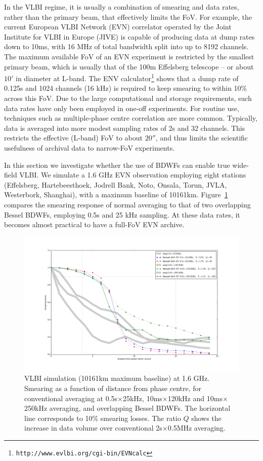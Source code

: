 \documentclass[useAMS,usenatbib]{mn2e}
\begin{document}
In the VLBI regime, it is usually a combination of smearing and data rates, rather than the primary beam, 
that effectively limits the FoV. For example, the current European VLBI Network (EVN) correlator 
\citep{keipema2015sfxc} operated by the Joint Institute for VLBI in Europe (JIVE) is capable of
producing data at dump rates down to 10ms, with 16 MHz of total bandwidth split into up to 8192 channels. 
The maximum available FoV of an EVN experiment is restricted  by the smallest primary beam, which is usually 
that of the 100m Effelsberg telescope -- or about $10'$ in diameter at L-band. The ENV 
calculator\footnote{{\tt http://www.evlbi.org/cgi-bin/EVNcalc}} shows that a dump rate of 0.125s and 1024 
channels (16 kHz) is required to keep smearing to within 10\% across this FoV. Due to the large computational 
and storage requirements, such data rates have only been employed in one-off experiments. For routine use, 
techniques such as  multiple-phase centre correlation are more common. Typically, data is averaged into more modest 
sampling rates of 2s and 32 channels. This restricts the effective (L-band) FoV to about $20''$, and thus limits the scientific usefulness of archival data to narrow-FoV experiments.

In this section we investigate whether the use of BDWFs can enable true wide-field VLBI. We simulate a 1.6 GHz 
EVN observation employing eight stations (Effelsberg, Hartebeesthoek, Jodrell Bank, Noto, Onsala, Torun, JVLA, 
Westerbork, Shanghai), with a maximum baseline of 10161km. Figure~\ref{fig:results-vlbi} compares the smearing 
response of normal averaging to that of two overlapping Bessel BDWFs, employing 0.5s and 25 kHz sampling. 
At these data rates, it becomes almost practical to have a full-FoV EVN archive. 

\begin{figure}
\includegraphics[width=.9\textwidth]{./Figures/suppression-vlbi2.png}
\caption{VLBI simulation (10161km maximum baseline) at 1.6 GHz. Smearing as a function of distance from 
phase centre, for conventional averaging at 0.5s$\times$25kHz, 10ms$\times$120kHz and 10ms$\times$250kHz averaging, 
and overlapping Bessel BDWFs. The horizontal line corresponds to 10\% smearing losses. The ratio $Q$ shows the 
increase in data volume over conventional 2s$\times$0.5MHz averaging.
}
\label{fig:results-vlbi}
\end{figure}
\end{document}
